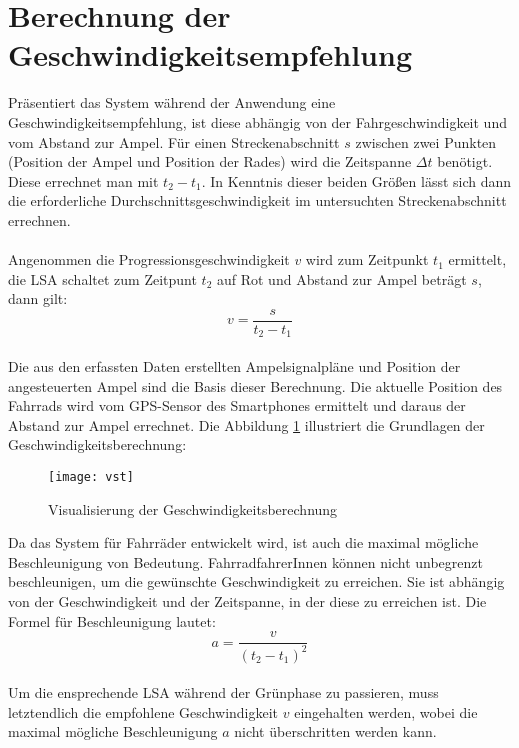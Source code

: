 \section{\label{sec:mathGrundlagen}Berechnung der Geschwindigkeitsempfehlung}
Präsentiert das System während der Anwendung eine Geschwindigkeitsempfehlung, ist diese abhängig von der Fahrgeschwindigkeit und vom Abstand zur Ampel. Für einen Streckenabschnitt $s$ zwischen zwei Punkten (Position der Ampel und Position der Rades) wird die Zeitspanne $\Delta t$ benötigt. Diese errechnet man mit $t_{2} - t_{1}$. In Kenntnis dieser beiden Größen lässt sich dann die erforderliche Durchschnittsgeschwindigkeit im untersuchten Streckenabschnitt errechnen.\\\\ 
Angenommen die Progressionsgeschwindigkeit $v$ wird zum Zeitpunkt $t_{1}$ ermittelt, die \gls {LSA} schaltet zum Zeitpunt $t_{2}$ auf Rot und Abstand zur Ampel beträgt $s$, dann gilt: \\
\[ v = \frac{s}{t_{2} - t_{1}} \] \\
Die aus den erfassten Daten erstellten Ampelsignalpläne und Position der angesteuerten Ampel sind die Basis dieser Berechnung. Die aktuelle Position des Fahrrads wird vom \gls{GPS}-Sensor des \glspl{Smartphone} ermittelt und daraus der Abstand zur Ampel errechnet. Die Abbildung \ref{fig:vst} illustriert die Grundlagen der Geschwindigkeitsberechnung: \\
\begin{figure}[H]  
    \centering  
    \texttt{[image: vst]}  
    \grayRule
    \caption[Berechnung Progressionsgeschwindigkeit]{Visualisierung der Geschwindigkeitsberechnung}
    \label{fig:vst}
\end{figure}
\clearpage
Da das System für Fahrräder entwickelt wird, ist auch die maximal mögliche Beschleunigung von Bedeutung. FahrradfahrerInnen können nicht unbegrenzt beschleunigen, um die gewünschte Geschwindigkeit zu erreichen. Sie ist abhängig von der Geschwindigkeit und der Zeitspanne, in der diese zu erreichen ist. Die Formel für Beschleunigung lautet:
\[ a = \frac{v}{(t_{2} - t_{1})^{2}} \]\\
 Um die ensprechende \gls{LSA} während der Grünphase zu passieren, muss letztendlich die empfohlene Geschwindigkeit $v$ eingehalten werden, wobei die maximal mögliche Beschleunigung $a$ nicht überschritten werden kann.

